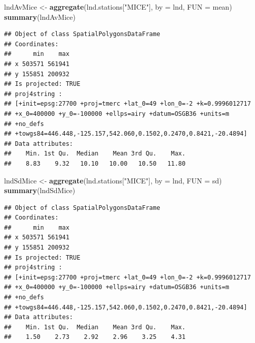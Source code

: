 \documentclass[]{article}
\newenvironment{Shaded}{}{}
\newcommand{\KeywordTok}[1]{\textcolor[rgb]{0.00,0.44,0.13}{\textbf{{#1}}}}
\newcommand{\DataTypeTok}[1]{\textcolor[rgb]{0.56,0.13,0.00}{{#1}}}
\newcommand{\DecValTok}[1]{\textcolor[rgb]{0.25,0.63,0.44}{{#1}}}
\newcommand{\StringTok}[1]{\textcolor[rgb]{0.25,0.44,0.63}{{#1}}}
\newcommand{\NormalTok}[1]{{#1}}
\begin{document}
\begin{Shaded}
\begin{Highlighting}[]
\NormalTok{lndAvMice <-}\StringTok{ }\KeywordTok{aggregate}\NormalTok{(lnd.stations[}\StringTok{"MICE"}\NormalTok{], }\DataTypeTok{by =} \NormalTok{lnd, }\DataTypeTok{FUN =} \NormalTok{mean)}
\KeywordTok{summary}\NormalTok{(lndAvMice)}
\end{Highlighting}
\end{Shaded}

\begin{verbatim}
## Object of class SpatialPolygonsDataFrame
## Coordinates:
##      min    max
## x 503571 561941
## y 155851 200932
## Is projected: TRUE 
## proj4string :
## [+init=epsg:27700 +proj=tmerc +lat_0=49 +lon_0=-2 +k=0.9996012717
## +x_0=400000 +y_0=-100000 +ellps=airy +datum=OSGB36 +units=m
## +no_defs
## +towgs84=446.448,-125.157,542.060,0.1502,0.2470,0.8421,-20.4894]
## Data attributes:
##    Min. 1st Qu.  Median    Mean 3rd Qu.    Max. 
##    8.83    9.32   10.10   10.00   10.50   11.80
\end{verbatim}

\begin{Shaded}
\begin{Highlighting}[]
\NormalTok{lndSdMice <-}\StringTok{ }\KeywordTok{aggregate}\NormalTok{(lnd.stations[}\StringTok{"MICE"}\NormalTok{], }\DataTypeTok{by =} \NormalTok{lnd, }\DataTypeTok{FUN =} \NormalTok{sd)}
\KeywordTok{summary}\NormalTok{(lndSdMice)}
\end{Highlighting}
\end{Shaded}

\begin{verbatim}
## Object of class SpatialPolygonsDataFrame
## Coordinates:
##      min    max
## x 503571 561941
## y 155851 200932
## Is projected: TRUE 
## proj4string :
## [+init=epsg:27700 +proj=tmerc +lat_0=49 +lon_0=-2 +k=0.9996012717
## +x_0=400000 +y_0=-100000 +ellps=airy +datum=OSGB36 +units=m
## +no_defs
## +towgs84=446.448,-125.157,542.060,0.1502,0.2470,0.8421,-20.4894]
## Data attributes:
##    Min. 1st Qu.  Median    Mean 3rd Qu.    Max. 
##    1.50    2.73    2.92    2.96    3.25    4.31
\end{verbatim}

\begin{Shaded}
\end{Shaded}
\end{document}
